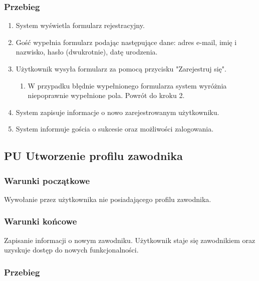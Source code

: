 \subsubsection{Przebieg}
\begin{enumerate}
  \item System wyświetla formularz rejestracyjny.
  \item Gość wypełnia formularz podając następujące dane: adres e-mail, imię i nazwisko, hasło (dwukrotnie), datę urodzenia.
  \item Użytkownik wysyła formularz za pomocą przycisku "Zarejestruj się".
  \begin{enumerate}[label=(\alph*)]
     \item W przypadku błędnie wypełnionego formularza system wyróżnia niepoprawnie wypełnione pola. Powrót do kroku 2.
   \end{enumerate}
  \item System zapisuje informacje o nowo zarejestrowanym użytkowniku.
  \item System informuje gościa o sukcesie oraz możliwości zalogowania.
\end{enumerate}


\subsection{PU Utworzenie profilu zawodnika}

\subsubsection{Warunki początkowe}
Wywołanie przez użytkownika nie posiadającego profilu zawodnika.

\subsubsection{Warunki końcowe}
Zapisanie informacji o nowym zawodniku. Użytkownik staje się zawodnikiem oraz uzyskuje dostęp do nowych funkcjonalności.

\subsubsection{Przebieg}

